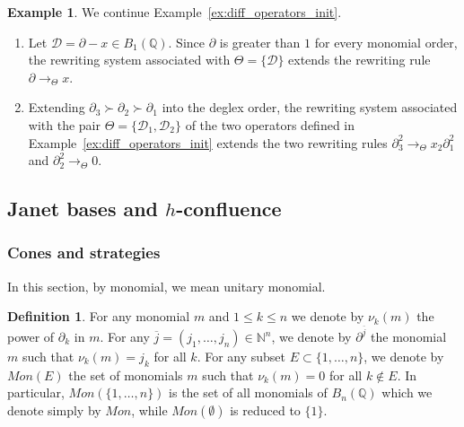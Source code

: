 \documentclass[10pt]{easychair}
\theoremstyle{definition}
\newtheorem{definition}[theorem]{Definition}
\newtheorem{example}[theorem]{Example}
\newcommand\D{\mathcal{D}}
\newcommand\Q{\mathbb{Q}}
\newcommand\Weyl[1]{B_{#1}(\Q)}
\newcommand\rewTheta{\to_{\Theta}}
\begin{document}
\begin{example}\label{ex:diff_operators_rew}
  We continue Example~\ref{ex:diff_operators_init}.
  \begin{enumerate}
  \item Let $\D=\partial-x\in\Weyl{1}$. Since $\partial$ is greater than
    $1$ for every monomial order, the rewriting system associated with
    $\Theta=\{\D\}$ extends the rewriting rule $\partial\rewTheta x$.
  \item\label{it:Janet_example_rew} Extending
    $\partial_3\succ\partial_2\succ\partial_1$ into the deglex order, the
    rewriting system associated with the pair $\Theta=\{\D_1,\D_2\}$ of
    the two operators defined in Example~\ref{ex:diff_operators_init}
    extends the two rewriting rules
    $\partial_3^2\rewTheta x_2\partial_1^2$ and
    $\partial_2^2\rewTheta 0$.
  \end{enumerate}
\end{example}
\smallskip

\subsection{Janet bases and $h$-confluence}
\label{sec:Janet_bases_and_h_confluence}

\subsubsection{Cones and strategies}

In this section, by monomial, we mean unitary monomial.




\begin{definition}
  For any monomial $m$ and $1 \leq k \leq n$ we denote by $\nu_k(m)$
  the power of $\partial_k$ in $m$.
  For any $\overline j =(j_1,\ldots,j_n) \in \mathbb N^n$, we denote by $\partial^{\overline j}$
  the monomial $m$ such that $\nu_k(m) = j_k$ for all $k$. For any subset
  $E \subset \{1,\ldots,n\}$, we denote by $Mon(E)$ the set of monomials $m$ such that
  $\nu_k(m) = 0$ for all $k \notin E$. In particular, $Mon(\{1,\ldots,n\})$ is the set of
  all monomials of $\Weyl n$ which we denote simply by $Mon$, while $Mon(\emptyset)$ is
  reduced to $\{1\}$. 
\end{definition}
\end{document}
